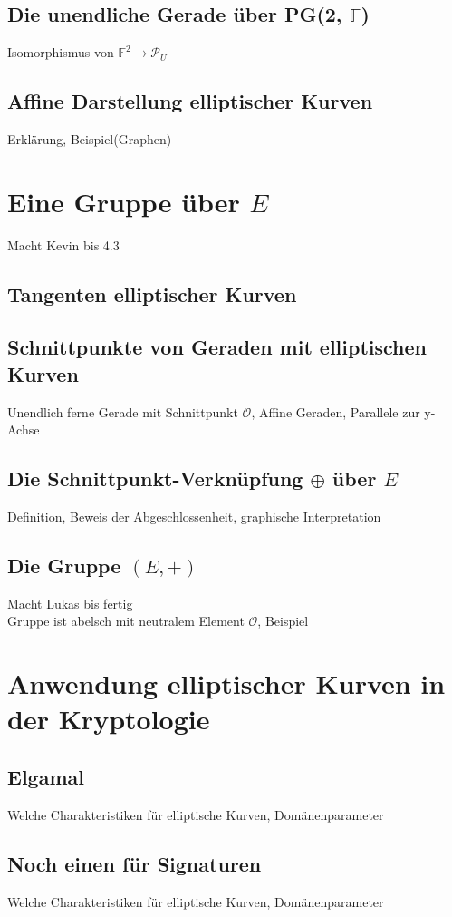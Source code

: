 \documentclass[hidelinks]{article}
\newcommand{\pgtwo}{PG(2, $\mathbb{F}$)\thinspace}
\begin{document}
\subsection{Die unendliche Gerade über \pgtwo}
Isomorphismus von $\mathbb{F}^2 \rightarrow \mathcal{P}_U$
\subsection{Affine Darstellung elliptischer Kurven}
Erklärung, Beispiel(Graphen)
\section{Eine Gruppe über $E$}
Macht Kevin bis 4.3\\
\subsection{Tangenten elliptischer Kurven}
\subsection{Schnittpunkte von Geraden mit elliptischen Kurven}
Unendlich ferne Gerade mit Schnittpunkt $\mathcal{O}$, Affine Geraden, Parallele zur y-Achse
\subsection{Die Schnittpunkt-Verknüpfung $\oplus $ über $E$}
Definition, Beweis der Abgeschlossenheit, graphische Interpretation
\subsection{Die Gruppe $(E, +)$}
Macht Lukas bis fertig\\
Gruppe ist abelsch mit neutralem Element $\mathcal{O}$, Beispiel
\section{Anwendung elliptischer Kurven in der Kryptologie}
\subsection{Elgamal}
Welche Charakteristiken für elliptische Kurven, Domänenparameter
\subsection{Noch einen für Signaturen}
Welche Charakteristiken für elliptische Kurven, Domänenparameter

\nocite{*}


\end{document}
